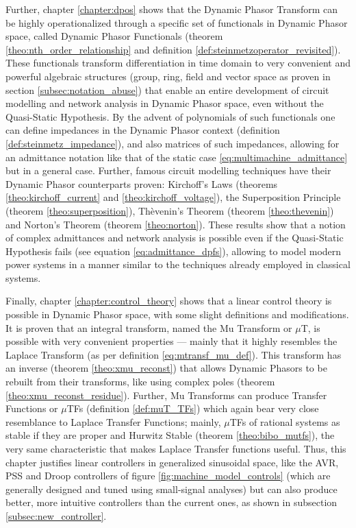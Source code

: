 	Further, chapter \ref{chapter:dpos} shows that the Dynamic Phasor Transform can be highly operationalized through a specific set of functionals in Dynamic Phasor space, called Dynamic Phasor Functionals (theorem \ref{theo:nth_order_relationship} and definition \ref{def:steinmetzoperator_revisited}). These functionals transform differentiation in time domain to very convenient and powerful algebraic structures (group, ring, field and vector space as proven in section \ref{subsec:notation_abuse}) that enable an entire development of circuit modelling and network analysis in Dynamic Phasor space, even without the Quasi-Static Hypothesis. By the advent of polynomials of such functionals one can define impedances in the Dynamic Phasor context (definition \ref{def:steinmetz_impedance}), and also matrices of such impedances, allowing for an admittance notation like that of the static case \eqref{eq:multimachine_admittance} but in a general case. Further, famous circuit modelling techniques have their Dynamic Phasor counterparts proven: Kirchoff's Laws (theorems \ref{theo:kirchoff_current} and \ref{theo:kirchoff_voltage}), the Superposition Principle (theorem \ref{theo:superposition}), Thèvenin's Theorem (theorem \ref{theo:thevenin}) and Norton's Theorem (theorem \ref{theo:norton}). These results show that a notion of complex admittances and network analysis is possible even if the Quasi-Static Hypothesis fails (see equation \eqref{eq:admittance_dpfs}), allowing to model modern power systems in a manner similar to the techniques already employed in classical systems.

	Finally, chapter \ref{chapter:control_theory} shows that a linear control theory is possible in Dynamic Phasor space, with some slight definitions and modifications. It is proven that an integral transform, named the Mu Transform or $\mu$T, is possible with very convenient properties — mainly that it highly resembles the Laplace Transform (as per definition \eqref{eq:mtransf_mu_def}). This transform has an inverse (theorem \ref{theo:xmu_reconst}) that allows Dynamic Phasors to be rebuilt from their transforms, like using complex poles (theorem \ref{theo:xmu_reconst_residue}). Further, Mu Transforms can produce Transfer Functions or $\mu$TFs (definition \ref{def:muT_TFs}) which again bear very close resemblance to Laplace Transfer Functions; mainly, $\mu$TFs of rational systems as stable if they are proper and Hurwitz Stable (theorem \ref{theo:bibo_mutfs}), the very same characteristic that makes Laplace Transfer functions useful. Thus, this chapter justifies linear controllers in generalized sinusoidal space, like the AVR, PSS and Droop controllers of figure \ref{fig:machine_model_controls} (which are generally designed and tuned using small-signal analyses) but can also produce better, more intuitive controllers than the current ones, as shown in subsection \ref{subsec:new_controller}.


